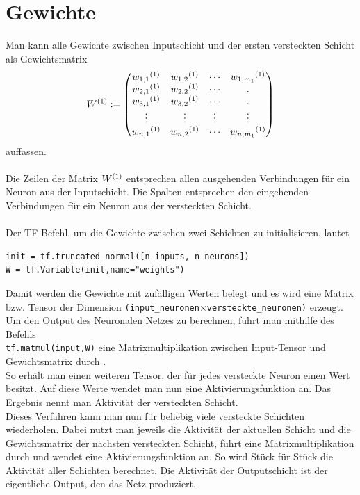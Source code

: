 \section{Gewichte}
Man kann alle Gewichte zwischen Inputschicht und der ersten versteckten Schicht als Gewichtsmatrix \begin{equation}
W\textsuperscript{(1)}:=
\begin{pmatrix}
w_{1,1}\textsuperscript{(1)} & w_{1,2}\textsuperscript{(1)} & \cdots & w_{1,m_1}\textsuperscript{(1)} \\
w_{2,1}\textsuperscript{(1)} & w_{2,2}\textsuperscript{(1)}& \cdots & .\\
w_{3,1}\textsuperscript{(1)} & w_{3,2}\textsuperscript{(1)}& \cdots & .\\
\vdots & \vdots & \vdots & \vdots \\
w_{n,1}\textsuperscript{(1)} & w_{n,2}\textsuperscript{(1)} & \cdots & w_{n,m_1}\textsuperscript{(1)}\\
\end{pmatrix} \end{equation}
auffassen.\\\\
Die Zeilen der Matrix $W\textsuperscript{(1)}$ entsprechen allen ausgehenden Verbindungen f\"ur ein Neuron aus der Inputschicht. Die Spalten entsprechen den eingehenden Verbindungen f\"ur ein Neuron aus der versteckten Schicht. \\\\
Der \gls{TF} Befehl, um die Gewichte zwischen zwei Schichten zu initialisieren, lautet \cite{handson}

\vspace{0.3cm}
\begin{lstlisting}
init = tf.truncated_normal([n_inputs, n_neurons])
W = tf.Variable(init,name="weights")
\end{lstlisting}

Damit werden die Gewichte mit zuf\"alligen Werten belegt und es wird eine Matrix bzw. Tensor der Dimension \lstinline$(input_neuronen$$ \times $\lstinline$versteckte_neuronen)$ erzeugt.\\
Um den Output des Neuronalen Netzes zu berechnen, f\"uhrt man mithilfe des Befehls\\ \lstinline$tf.matmul(input,W)$ eine Matrixmultiplikation zwischen Input-Tensor und Gewichtsmatrix durch \cite{handson}. \\
So erhält man einen weiteren Tensor, der f\"ur jedes versteckte Neuron einen Wert besitzt. Auf diese Werte wendet man nun eine Aktivierungsfunktion an. Das Ergebnis nennt man Aktivit\"at \cite{Ertel2013} der versteckten Schicht.\\
Dieses Verfahren kann man nun f\"ur beliebig viele versteckte Schichten wiederholen. Dabei nutzt man jeweils die Aktivit\"at der aktuellen Schicht und die Gewichtsmatrix der nächsten versteckten Schicht, führt eine Matrixmultiplikation durch und wendet eine Aktivierungsfunktion an. So wird Stück für Stück die Aktivit\"at aller Schichten berechnet. Die Aktivität der Outputschicht ist der eigentliche Output, den das Netz produziert.


